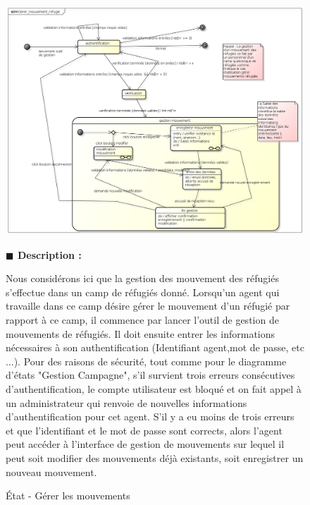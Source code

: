 \documentclass[11pt, titlepage]{report}
\newcommand{\debutDescription}{\noindent\textbf{\textcolor{DescriptionColor}{$\blacksquare$  Description : \\}}}
\begin{document}
\begin{figure}[h!]
\begin{center}
 \includegraphics[scale=.4]{../images/diagrammes/uml/exigence_1/etat_gerer_mouvement_refugie.png} 
\caption{État - Gérer les mouvements}
\end{center}
\debutDescription
\begin{small}
Nous considérons ici que la gestion des mouvement des réfugiés s’effectue dans un camp de réfugiés donné. Lorsqu’un agent qui travaille dans ce camp désire gérer le mouvement d'un réfugié par rapport à ce camp, il commence par lancer l'outil de gestion de mouvements de réfugiés. Il doit ensuite entrer les informations nécessaires à son authentification (Identifiant agent,mot de passe, etc ...). Pour des raisons de sécurité, tout comme pour le diagramme d'états "Gestion Campagne", s'il survient trois erreurs consécutives d'authentification, le compte utilisateur est bloqué et on fait appel à un administrateur qui renvoie de nouvelles informations d’authentification pour cet agent. S'il y a eu moins de trois erreurs et que l'identifiant et le mot de passe sont corrects, alors l'agent peut accéder à l'interface de gestion de mouvements sur lequel il peut soit modifier des mouvements déjà existants, soit enregistrer un nouveau mouvement.\\

\end{small}
\end{figure}
\end{document}
